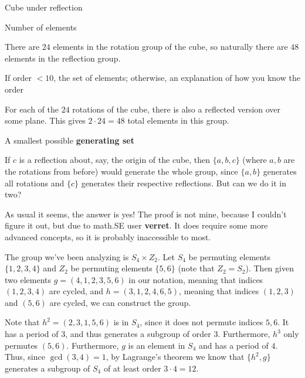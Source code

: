 \documentclass[../key.tex]{subfiles}
\begin{document}
\begin{outer_problem}
\item Cube under reflection
\end{outer_problem}

\begin{inner_problem}[start=1]
\item Number of elements
\end{inner_problem}

\noindent There are $24$ elements in the rotation group of the cube, so naturally there are $48$ elements in the reflection group.

\begin{inner_problem}
\item If order $< 10$, the set of elements; otherwise, an explanation of how you know the order
\end{inner_problem}

\noindent For each of the $24$ rotations of the cube, there is also a reflected version over some plane. This gives $2\cdot 24=48$ total elements in this group.

\begin{inner_problem}
\item A smallest possible \textbf{generating set}
\end{inner_problem}

\noindent If $c$ is a reflection about, say, the origin of the cube, then $\{a,b,c\}$ (where $a,b$ are the rotations from before) would generate the whole group, since $\{a,b\}$ generates all rotations and $\{c\}$ generates their respective reflections. But can we do it in two?

As usual it seems, the answer is yes! The proof is not mine, because I couldn't figure it out, but due to math.SE user \textbf{verret}. It does require some more advanced concepts, so it is probably inaccessible to most.

The group we've been analyzing is $S_4\times Z_2$. Let $S_4$ be permuting elements $\{1,2,3,4\}$ and $Z_2$ be permuting elements $\{5,6\}$ (note that $Z_2=S_2$). Then given two elements $g=(4,1,2,3,5,6)$ in our notation, meaning that indices $(1,2,3,4)$ are cycled, and $h=(3,1,2,4,6,5)$, meaning that indices $(1,2,3)$ and $(5,6)$ are cycled, we can construct the group.

Note that $h^2=(2,3,1,5,6)$ is in $S_4$, since it does not permute indices $5,6$. It has a period of $3$, and thus generates a subgroup of order $3$. Furthermore, $h^3$ only permutes $(5,6)$. Furthermore, $g$ is an element in $S_4$ and has a period of $4$. Thus, since $\gcd(3,4)=1$, by Lagrange's theorem we know that $\{h^2,g\}$ generates a subgroup of $S_4$ of at least order $3\cdot 4=12$.
\end{document}
